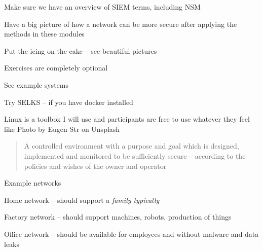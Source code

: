 \documentclass[Screen16to9,17pt]{foils}
\begin{document}


\begin{list2}
\item Make sure we have an overview of SIEM terms, including NSM
\item Have a big picture of how a network can be more secure after applying the methods in these modules
\item Put the icing on the cake -- see beautiful pictures
\end{list2}




Exercises are completely optional

\begin{list2}
\item See example systems
\item Try SELKS -- if you have docker installed
\item
\end{list2}

Linux is a toolbox I will use and participants are free to use whatever they feel like
\hfill Photo by Eugen Str on Unsplash






\begin{quote}
A controlled environment with a purpose and goal which is designed, implemented and monitored to be sufficiently secure -- according to the policies and wishes of the owner and operator
\end{quote}

Example networks
\begin{list2}
\item Home network -- should support a \emph{family typically}
\item Factory network -- should support machines, robots, production of things
\item Office network -- should be available for employees and without malware and data leaks
\end{list2}

\end{document}
